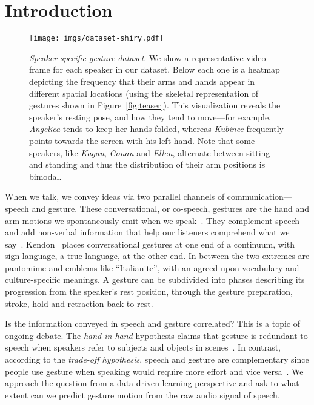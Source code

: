 \documentclass[10pt,twocolumn,letterpaper]{article}
\newcommand{\fig}[1]{Figure~\ref{#1}}
\begin{document}
\section{Introduction}

\begin{figure*}
\centering
  \texttt{[image: imgs/dataset-shiry.pdf]}
\vspace{-4mm}
  \caption{{\em Speaker-specific gesture dataset}. We show a representative video frame for each speaker in our dataset. Below each one is a heatmap depicting the frequency that their
  arms and hands appear in different spatial locations (using the skeletal representation of gestures shown in \fig{fig:teaser}). This visualization reveals the speaker's resting pose, and how they tend to move---for example, {\em Angelica} tends to keep her hands folded, whereas {\em Kubinec} frequently points towards the screen with his left hand. Note that some speakers, like {\em Kagan}, {\em Conan} and {\em Ellen}, alternate between sitting and standing and thus the distribution of their arm positions is bimodal.}
\label{fig:data-stats}
\end{figure*}

When we talk, we convey ideas via two parallel channels of communication---speech and
gesture. These conversational, or co-speech, gestures are the hand and arm motions we
spontaneously emit when we speak~\cite{McNeill92}. They complement speech and add non-verbal information that help our listeners comprehend what we say~\cite{Cassell-listeners}.
Kendon~\cite{kendon_2004} places conversational gestures at one end of a continuum, with sign language, a true language, at the other end. In between the
two extremes are pantomime and emblems like ``Italianite'', with an agreed-upon vocabulary and culture-specific meanings. A gesture can be subdivided into phases describing its progression from the speaker's rest position, through the gesture preparation, stroke, hold and retraction back to rest.

Is the information conveyed in speech and gesture correlated? This is a topic of ongoing debate. The {\em hand-in-hand} hypothesis claims that gesture is redundant to speech when speakers refer to subjects and objects in scenes~\cite{hand-in-hand}. In contrast, according to the {\em trade-off hypothesis}, speech and gesture are complementary since people use gesture when speaking would require more effort and vice versa~\cite{tradeoff}. We approach the question from a data-driven learning perspective and ask to what extent can we predict gesture motion from the raw audio signal of speech.
\end{document}
